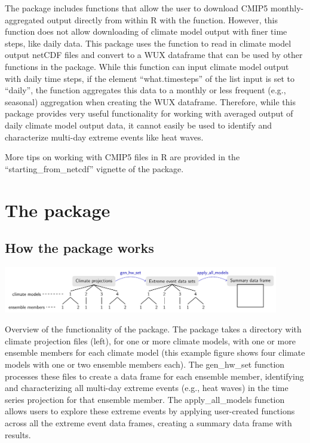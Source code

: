 The  package \citep{wux} includes functions that allow the user
to download CMIP5 monthly-aggregated output directly from within R with
the  function. However, this function does not allow
downloading of climate model output with finer time steps, like daily
data. This package uses the  function to read in
climate model output netCDF files and convert to a WUX dataframe that
can be used by other functions in the package. While this function can
input climate model output with daily time steps, if the element
``what.timesteps'' of the  list input is set to
``daily'', the function aggregates this data to a monthly or less
frequent (e.g., seasonal) aggregation when creating the WUX dataframe.
Therefore, while this package provides very useful functionality for
working with averaged output of daily climate model output data, it
cannot easily be used to identify and characterize multi-day extreme
events like heat waves.

More tips on working with CMIP5 files in R are provided in the
``starting\_from\_netcdf'' vignette of the 
package.

\section{\texorpdfstring{The 
package}{The  package}}\label{the-package}

\subsection{How the package works}\label{how-the-package-works}

\begin{widefigure}
\includegraphics[width = 0.9\textwidth]{OverviewFigure}
\caption{Overview of the functionality of the  package. The package takes a directory with climate projection files (left), for one or more climate models, with one or more ensemble members for each climate model (this example figure shows four climate models with one or two ensemble members each). The gen\_hw\_set function processes these files to create a data frame for each ensemble member, identifying and characterizing all multi-day extreme events (e.g., heat waves) in the time series projection for that ensemble member. The apply\_all\_models function allows users to explore these extreme events by applying user-created functions across all the extreme event data frames, creating a summary data frame with results.}
\label{fig:overview}
\end{widefigure}

